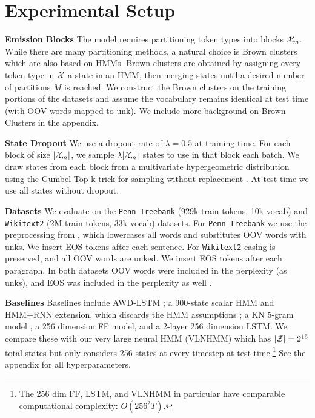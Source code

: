 \documentclass[11pt,a4paper]{article}
\begin{document}
\section{Experimental Setup}
\label{sec:experiments}

\noindent\textbf{Emission Blocks}
The model requires partitioning token types into blocks $\mathcal{X}_m$. 
While there are many partitioning methods, a natural choice
is Brown clusters \citep{brown1992,liang2005brown} which are also based on HMMs.
Brown clusters are obtained by assigning every token type in $\mathcal{X}$ a state in an HMM,
then merging states until a desired number of partitions $M$ is reached.
We construct the Brown clusters on the training portions of the datasets
and assume the vocabulary remains identical at test time (with OOV words mapped to unk).
We include more background on Brown Clusters in the appendix.

\noindent\textbf{State Dropout}
We use a dropout rate of $\lambda = 0.5$ at training time. 
For each block of size $|\mathcal{X}_m|$, we sample $\lambda|\mathcal{X}_m|$ states to use in that block each batch.
We draw states from each block from a multivariate hypergeometric distribution
using the Gumbel Top-k trick for sampling without replacement \citep{vieira2014gumbel}.
At test time we use all states without dropout.

\noindent \textbf{Datasets}
We evaluate on the \texttt{Penn Treebank} \citep{ptb} (929k train tokens, 10k vocab)
and \texttt{Wikitext2} \citep{wikitext} (2M train tokens, 33k vocab) datasets.
For \texttt{Penn Treebank} we use the preprocessing from \citet{mikolov-2011},
which lowercases all words and substitutes OOV words with unks. 
We insert EOS tokens after each sentence.
For \texttt{Wikitext2} casing is preserved, and all OOV words are unked.
We insert EOS tokens after each paragraph.
In both datasets OOV words were included in the perplexity (as unks),
and EOS was included in the perplexity as well \citep{merity2017awdlstm}.

\noindent \textbf{Baselines}
Baselines include AWD-LSTM \citep{merity2017awdlstm};
a 900-state scalar HMM and HMM+RNN extension,
which discards the HMM assumptions \citep{buys2018hmm};
a KN 5-gram model \citep{mikolov2012rnn,kenlm},
a 256 dimension FF model,
and a 2-layer 256 dimension LSTM.
We compare these with our very large neural HMM (VLNHMM)
which has $|\mathcal{Z}|=2^{15}$ total states but only considers 256 states at every timestep at
test time.\footnote{
The 256 dim FF, LSTM, and VLNHMM in particular
have comparable computational complexity: $O(256^2 T)$.
}
See the appendix for all hyperparameters.
\end{document}
